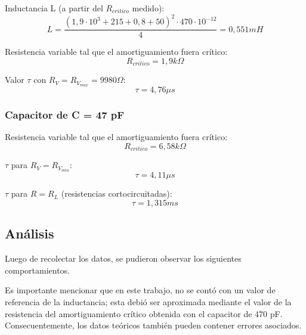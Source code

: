 \documentclass{article}
\begin{document}
                Inductancia L (a partir del $R_{critico}$ medido):
                \begin{equation*}
                    L=\frac{(1,9\cdot10^3 + 215 + 0,8 + 50)^2 \cdot 470 \cdot 10^{-12}}{4}= 0,551 mH
                \end{equation*} \par
                
                Resistencia variable tal que el amortiguamiento fuera crítico:
                \begin{equation*}
                    R_{critico} = 1,9 k\Omega
                \end{equation*} \par

        
                Valor $ \tau $ con $ R_V = R_{V_{max}} = 9980 \Omega $:
                 \begin{equation*}
                    \tau = 4,76 \mu s 
                \end{equation*}

            \subsubsection*{Capacitor de C = 47 pF}
                Resistencia variable tal que el amortiguamiento fuera crítico:
                \begin{equation*}
                    R_{critico} = 6,58 k\Omega 
                \end{equation*} \par
                
                $ \tau $ para $ R_V = R_{V_{min}} $: 
                \begin{equation*}
                    \tau = 4,11 \mu s 
                \end{equation*} \par

                $ \tau $ para $ R = R_L $ (resistencias cortocircuitadas):
                \begin{equation*}
                    \tau =  1,315 ms 
                \end{equation*}
        


    \subsection{Análisis}
    
    	Luego de recolectar los datos, se pudieron observar los siguientes comportamientos. \par
	Es importante mencionar que en este trabajo, no se contó con un valor de referencia de la inductancia;
     esta debió ser aproximada mediante el valor de la resistencia del amortiguamiento crítico obtenida con el capacitor de 470 pF. Consecuentemente, los datos teóricos también pueden contener errores asociados.
	
\end{document}
